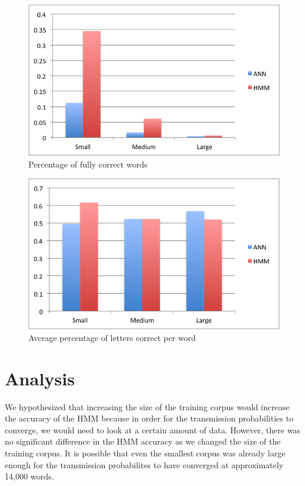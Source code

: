 \documentclass[11pt,a4paper,twocolumn]{article}
\begin{document}
\begin{figure}[h]
\centering
\caption{Percentage of fully correct words}
\includegraphics[scale=0.55]{img/wordsCorrect.png}
\end{figure}

\begin{figure}[h]
\centering
\caption{Average percentage of letters correct per word}
\includegraphics[scale=0.55]{img/wordCorrectness.png}
\end{figure}


\section{Analysis}

We hypothesized that increasing the size of the training corpus would increase the accuracy of the HMM because in order for the transmission probabilities to converge, we would need to look at a certain amount of data. However, there was no significant difference in the HMM accuracy as we changed the size of the training corpus. It is possible that even the smallest corpus was already large enough for the transmission probabilites to have converged at approximately 14,000 words.
\end{document}
